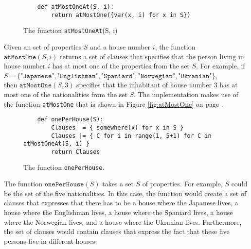 \begin{figure}[!ht]
\centering
\begin{verbatim}
    def atMostOneAt(S, i):
        return atMostOne({var(x, i) for x in S})
\end{verbatim}
\vspace*{-0.3cm}
\caption{The function \texttt{atMostOneAt}(S, i)}
\label{fig:atMostOneAt}
\end{figure}

Given an set of properties $S$ and a house number $i$, the function
$\texttt{atMostOne}(S, i)$ returns a set of clauses that specifies that the
person living in house number $i$ has at most one of the properties from the set
$S$.  For example, if  
\\[0.2cm]
\hspace*{1.3cm}
$S = \{\texttt{"Japanese"}, \texttt{"Englishman"}, \texttt{"Spaniard"}, \texttt{"Norwegian"}, \texttt{"Ukranian"}\}$, 
\\[0.2cm]
then $\texttt{atMostOne}(S, 3)$ specifies that the inhabitant of house number 3
has at most one of the nationalities from the set $S$.   The implementation
makes use of the function \texttt{atMostOne} that is shown in Figure
\ref{fig:atMostOne} on page \pageref{fig:atMostOne}.

\begin{figure}[!ht]
\centering
\begin{verbatim}
    def onePerHouse(S):
        Clauses  = { somewhere(x) for x in S } 
        Clauses |= { C for i in range(1, 5+1) for C in atMostOneAt(S, i) }
        return Clauses
\end{verbatim}
\vspace*{-0.3cm}
\caption{The function \texttt{onePerHouse}.}
\label{fig:onePerHouse}
\end{figure}

The function $\texttt{onePerHouse}(S)$ takes a set $S$ of properties.  For
example, $S$ could be the set of the five nationalities.
In this case, the function would create a set of clauses that expresses that
there has to be a house where the Japanese lives, a house where the Englishman
lives, a house where the Spaniard lives, a house where the Norwegian lives, and
a house where the Ukranian lives.  Furthermore, the set of clauses would contain
clauses that express the fact that these five persons live in different houses.


